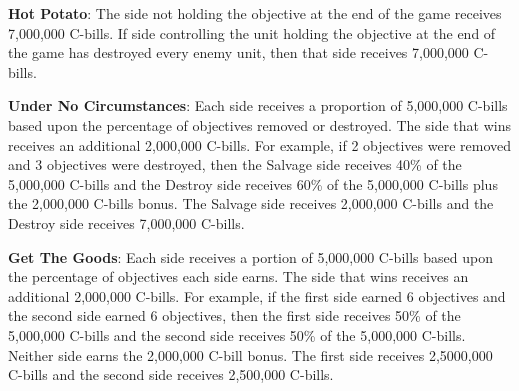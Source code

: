 \begin{description}
\item {\bfseries Hot Potato}: The side not holding the objective at the end of the game receives 7,000,000 C-bills.
If side controlling the unit holding the objective at the end of the game has destroyed every enemy unit, then that side receives 7,000,000 C-bills.

\item {\bfseries Under No Circumstances}: Each side receives a proportion of 5,000,000 C-bills based upon the percentage of objectives removed or destroyed.
The side that wins receives an additional 2,000,000 C-bills.
For example, if 2 objectives were removed and 3 objectives were destroyed, then the Salvage side receives 40\% of the 5,000,000 C-bills and the Destroy side receives 60\% of the 5,000,000 C-bills plus the 2,000,000 C-bills bonus.
The Salvage side receives 2,000,000 C-bills and the Destroy side receives 7,000,000 C-bills.

\item {\bfseries Get The Goods}: Each side receives a portion of 5,000,000 C-bills based upon the percentage of objectives each side earns.
The side that wins receives an additional 2,000,000 C-bills.
For example, if the first side earned 6 objectives and the second side earned 6 objectives, then the first side receives 50\% of the 5,000,000 C-bills and the second side receives 50\% of the 5,000,000 C-bills.
Neither side earns the 2,000,000 C-bill bonus.
The first side receives 2,5000,000 C-bills and the second side receives 2,500,000 C-bills.

\end{description}
